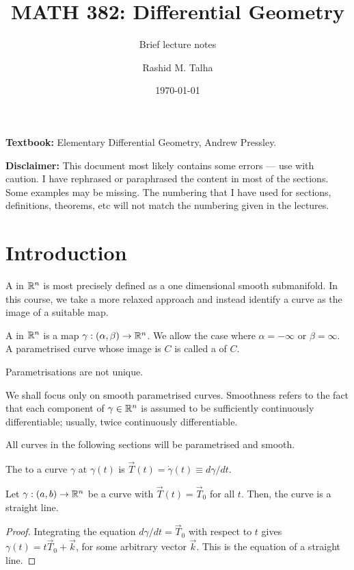 \documentclass[11pt]{penrose}
\title{MATH 382: Differential Geometry}
\subtitle{Brief lecture notes}
\author{Rashid M. Talha}
\affiliation{School of Natural Sciences, NUST}
\date{\today}
\newcommand{\vT}{\vec{T}}
\begin{document}
\maketitle

\textbf{Textbook:} Elementary Differential Geometry, Andrew Pressley.

\textbf{Disclaimer:} This document most likely contains some errors --- use with caution. I have rephrased or paraphrased the content in most of the sections. Some examples may be missing. The numbering that I have used for sections, definitions, theorems, etc will not match the numbering given in the lectures.

\section{Introduction}
A  in $\mathbb{R}^n$ is most precisely defined as a one dimensional smooth submanifold. In this course, we take a more relaxed approach and instead identify a curve as the image of a suitable map.

\begin{ndfn}
    A  in $\mathbb{R}^n$ is a map $\gamma : (\alpha, \beta) \to \mathbb{R}^n$. We allow the case where $\alpha = -\infty$ or $\beta = \infty$. A parametrised curve whose image is $C$ is called a  of $C$.
\end{ndfn}

Parametrisations are not unique.

We shall focus only on smooth parametrised curves. Smoothness refers to the fact that each component of $\gamma \in \mathbb{R}^n$ is assumed to be sufficiently continuously differentiable; usually, twice continuously differentiable.

All curves in the following sections will be parametrised and smooth.

\begin{ndfn}
    The  to a curve $\gamma$ at $\gamma(t)$ is $\vT(t) = \dot{\gamma}(t) \equiv d\gamma/dt$.
\end{ndfn}

\begin{nprop}
    Let $\gamma : (a, b) \to \mathbb{R}^n$ be a curve with $\vT(t) = \vT_0$ for all $t$. Then, the curve is a straight line.
\end{nprop}
\begin{proof}
    Integrating the equation $d\gamma/dt = \vT_0$ with respect to $t$ gives $\gamma(t) = t \vT_0 + \vec{k}$, for some arbitrary vector $\vec{k}$. This is the equation of a straight line.
\end{proof}
\end{document}
